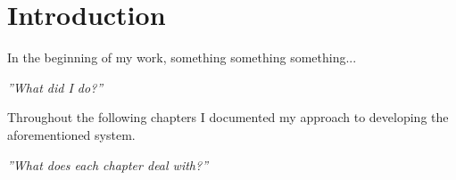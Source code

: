 \chapter{Introduction}
\label{introduction}

In the beginning of my work, something something something...
\begin{center}
	\textit{''What did I do?''}
\end{center} 

Throughout the following chapters I documented my approach to developing the aforementioned system.
\begin{center}
	\textit{''What does each chapter deal with?''}
\end{center} 

%
